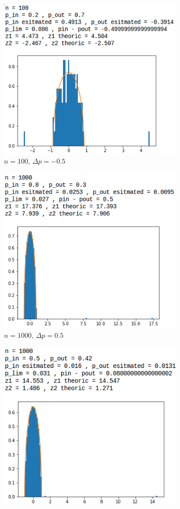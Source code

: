 \begin{figure}[p]
\begin{subfigure}{.5\textwidth}
		\includegraphics[scale=0.58]{static/spectral_n100_pin02_pout07.png}
		\caption{$n=100$, $\Delta p=-0.5$}
		\label{n100delta-05}
	\end{subfigure}
	\begin{subfigure}{.5\textwidth}
		\centering
		\includegraphics[scale=0.58]{static/spectral_n1000_pin08_pout03.png}
		\caption{$n=1000$, $\Delta p=0.5$}
		\label{n1000delta05}
	\end{subfigure}
	\begin{subfigure}{.5\textwidth}
		\centering
		\includegraphics[scale=0.58]{static/spectral_n1000_pin05_pout042.png}

\end{subfigure}
\end{figure}

